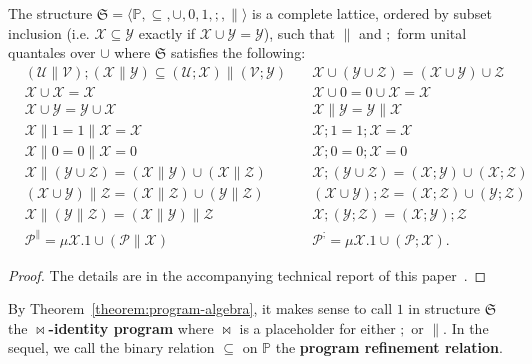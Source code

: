 \documentclass{llncs}
\newcommand{\tuple}[1]{\mbox{$\langle #1 \rangle$}}
\newcommand{\cP}{\mathcal{P}}
\newcommand{\cU}{\mathcal{U}}
\newcommand{\cV}{\mathcal{V}}
\newcommand{\cX}{\mathcal{X}}
\newcommand{\cY}{\mathcal{Y}}
\newcommand{\cZ}{\mathcal{Z}}
\newcommand{\mfrS}{\mathfrak{S}}
\newcommand{\bbP}{\mathbb{P}}
\newcommand{\defn}[1]{\textbf{#1}}
\begin{document}
\begin{theorem}
\label{theorem:program-algebra}
The structure $\mfrS = \tuple{\bbP, \subseteq, \cup, 0, 1, ;, \parallel}$ is a complete lattice, ordered by subset inclusion (i.e. $\cX \subseteq \cY$ exactly if $\cX \cup \cY = \cY$), such that $\parallel$ and $;$ form unital quantales over $\cup$ where $\mfrS$ satisfies the following:
\begin{align*}
&(\cU \parallel \cV) ; (\cX \parallel \cY) \subseteq (\cU ; \cX) \parallel (\cV ; \cY) &\quad  \cX \cup (\cY \cup \cZ) = (\cX \cup \cY) \cup \cZ  \\
&\cX \cup \cX = \cX &\quad  \cX \cup 0 = 0 \cup \cX = \cX                                                                             \\
&\cX \cup \cY = \cY \cup \cX &\quad \cX \parallel \cY = \cY \parallel \cX                                                          \\
&\cX \parallel 1 = 1 \parallel \cX = \cX &\quad \cX ; 1 = 1 ; \cX = \cX                                                      \\
&\cX \parallel 0 = 0 \parallel \cX = 0   &\quad \cX ; 0 = 0 ; \cX = 0                                                        \\
&\cX \parallel (\cY \cup \cZ) = (\cX \parallel \cY) \cup (\cX \parallel \cZ) &\quad  \cX ; (\cY \cup \cZ) = (\cX ; \cY) \cup (\cX ; \cZ) \\
&(\cX \cup \cY) \parallel \cZ = (\cX \parallel \cZ) \cup (\cY \parallel \cZ) &\quad (\cX \cup \cY) ; \cZ = (\cX ; \cZ) \cup (\cY ; \cZ)  \\
&\cX \parallel (\cY \parallel \cZ) = (\cX \parallel \cY) \parallel \cZ &\quad \cX ; (\cY ; \cZ) = (\cX ; \cY) ; \cZ          \\
&\cP^{\parallel} = \mu \cX .1 \cup (\cP \parallel \cX) &\quad \cP^{;} = \mu \cX .1 \cup (\cP ; \cX).                                   
\end{align*}
\end{theorem}
\begin{proof}
The details are in the accompanying technical report of this paper~\cite{HA2014}.
\end{proof}

By Theorem~\ref{theorem:program-algebra}, it makes sense to call $1$ in structure $\mfrS$ the \defn{$\Join$-identity program} where $\Join$ is a placeholder for either $;$ or $\parallel$. In the sequel, we call the binary relation $\subseteq$ on $\bbP$ the \defn{program refinement relation}.
\end{document}
